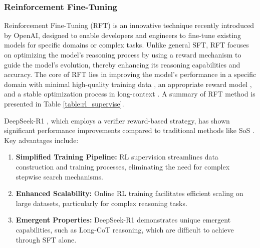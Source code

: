 \subsubsection{Reinforcement Fine-Tuning}\label{rl_supervise}

Reinforcement Fine-Tuning (RFT) \cite{openaiRFT} is an innovative technique recently introduced by OpenAI, designed to enable developers and engineers to fine-tune existing models for specific domains or complex tasks. Unlike general SFT, RFT focuses on optimizing the model's reasoning process by using a reward mechanism to guide the model's evolution, thereby enhancing its reasoning capabilities and accuracy. 
The core of RFT lies in improving the model's performance in a specific domain with minimal high-quality training data \cite{chang2024survey}, an appropriate reward model \cite{trung2024reft}, and a stable optimization process in long-context \cite{blobRFT, codepmp, nextlong, quest}. 
A summary of RFT method is presented in Table \ref{table:rl_supervise}.







DeepSeek-R1 \cite{Deepseek-R1}, which employs a verifier reward-based strategy, has shown significant performance improvements compared to traditional methods like SoS \cite{SoS}. Key advantages include:
\begin{enumerate}[itemindent=0em]
    \item \textbf{Simplified Training Pipeline:} RL supervision streamlines data construction and training processes, eliminating the need for complex stepwise search mechanisms. 
    
    \item \textbf{Enhanced Scalability:} Online RL training facilitates efficient scaling on large datasets, particularly for complex reasoning tasks.
    
    \item \textbf{Emergent Properties:} DeepSeek-R1 \cite{Deepseek-R1} demonstrates unique emergent capabilities, such as Long-CoT reasoning, which are difficult to achieve through SFT alone.
\end{enumerate}



